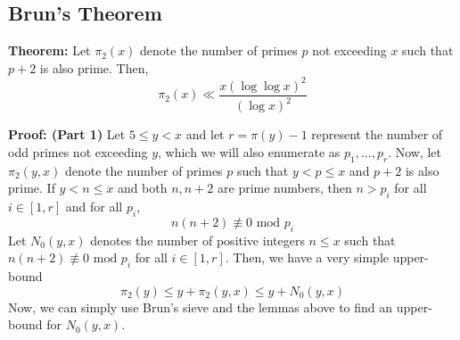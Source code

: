 \documentclass[8pt]{extarticle}
\begin{document}
\subsection{Brun's Theorem}
\begin{boxedsection}
    \textbf{Theorem:} Let $\pi_2(x)$ denote the number of primes $p$ not exceeding $x$ such that $p+2$ is also prime. Then,
    $$
    \pi_2(x) \ll \frac{x (\log \log x)^2}{(\log x)^2}
    $$
\end{boxedsection}
\begin{boxedsection}
    \textbf{Proof: (Part 1)} Let $5 \leq y < x$ and let $r = \pi(y) - 1$ represent the number of odd primes not exceeding $y$, which we will also enumerate as $p_1, \dots, p_r$. Now, let $\pi_2(y,x)$ denote the 
    number of primes $p$ such that $y < p \leq x$ and $p+2$ is also prime. If $y < n \leq x$ and both $n, n+2$ are prime numbers, then $n > p_i$ for all $i \in [1,r]$ and for all $p_i$,
    $$
    n(n+2) \nequiv 0 \text{ mod } p_i
    $$
    Let $N_0(y,x)$ denotes the number of positive integers $n \leq x$ such that $n(n+2) \nequiv 0 \text{ mod } p_i$ for all $i \in [1,r]$. Then, we have a very simple upper-bound
    $$
    \pi_2(y) \leq y + \pi_2(y,x) \leq y + N_0(y,x)
    $$
    Now, we can simply use Brun's sieve and the lemmas above to find an upper-bound for $N_0(y,x)$.
\end{boxedsection}
\end{document}
